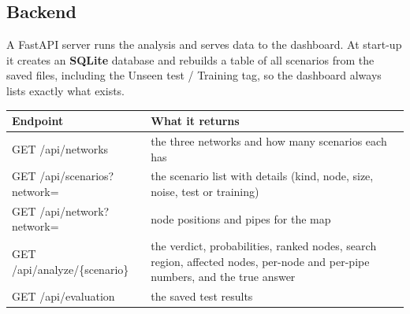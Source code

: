 \documentclass[11pt,a4paper]{article}
\begin{document}
\subsection{Backend}
A FastAPI server runs the analysis and serves data to the dashboard. At start-up it creates an \textbf{SQLite} database and rebuilds a table of all scenarios from the saved files, including the Unseen test / Training tag, so the dashboard always lists exactly what exists.
\begin{center}\small\begin{tabularx}{\linewidth}{@{}>{\ttfamily}p{5.0cm}Y@{}}\toprule
Endpoint & What it returns \\\midrule
GET /api/networks & the three networks and how many scenarios each has \\
GET /api/scenarios?network= & the scenario list with details (kind, node, size, noise, test or training) \\
GET /api/network?network= & node positions and pipes for the map \\
GET /api/analyze/\{scenario\} & the verdict, probabilities, ranked nodes, search region, affected nodes, per-node and per-pipe numbers, and the true answer \\
GET /api/evaluation & the saved test results \\\bottomrule\end{tabularx}\end{center}
\end{document}
